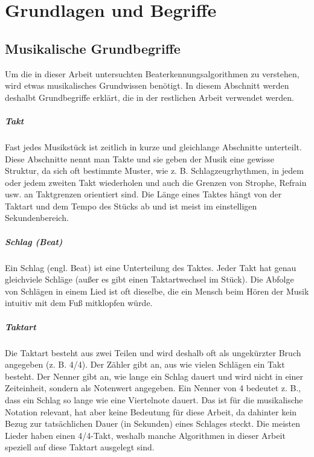 \chapter{Grundlagen und Begriffe}
\label{grundlagen}
\acresetall

\section{Musikalische Grundbegriffe}
{
	Um die in dieser Arbeit untersuchten Beaterkennungsalgorithmen zu verstehen,
		wird etwas musikalisches Grundwissen benötigt.
	In diesem Abschnitt werden deshalbt Grundbegriffe erklärt,
		die in der restlichen Arbeit verwendet werden.

	\paragraph{Takt}
	{
		Fast jedes Musikstück ist zeitlich in kurze und gleichlange Abschnitte unterteilt.
		Diese Abschnitte nennt man Takte
			und sie geben der Musik eine gewisse Struktur,
			da sich oft bestimmte Muster, wie z. B. Schlagzeugrhythmen, in jedem oder jedem zweiten Takt wiederholen
			und auch die Grenzen von Strophe, Refrain usw. an Taktgrenzen orientiert sind.
		Die Länge eines Taktes hängt von der Taktart und dem Tempo des Stücks ab
			und ist meist im einstelligen Sekundenbereich.
	}

	\paragraph{Schlag (Beat)}
	{
		Ein Schlag (engl. Beat) ist eine Unterteilung des Taktes.
		Jeder Takt hat genau gleichviele Schläge (au{\ss}er es gibt einen Taktartwechsel im Stück).
		Die Abfolge von Schlägen in einem Lied ist oft dieselbe,
			die ein Mensch beim Hören der Musik intuitiv mit dem Fu{\ss} mitklopfen würde.
	}

	\paragraph{Taktart}
	{
		Die Taktart besteht aus zwei Teilen
			und wird deshalb oft als ungekürzter Bruch angegeben (z. B. 4/4).
		Der Zähler gibt an,
			aus wie vielen Schlägen ein Takt besteht.
		Der Nenner gibt an,
			wie lange ein Schlag dauert
			und wird nicht in einer Zeiteinheit,
			sondern als Notenwert angegeben.
		Ein Nenner von 4 bedeutet z. B.,
			dass ein Schlag so lange wie eine Viertelnote dauert.
		Das ist für die musikalische Notation relevant,
			hat aber keine Bedeutung für diese Arbeit,
			da dahinter kein Bezug zur tatsächlichen Dauer (in Sekunden) eines Schlages steckt.
		Die meisten Lieder haben einen 4/4-Takt,
			weshalb manche Algorithmen in dieser Arbeit speziell auf diese Taktart ausgelegt sind.
	}

}
